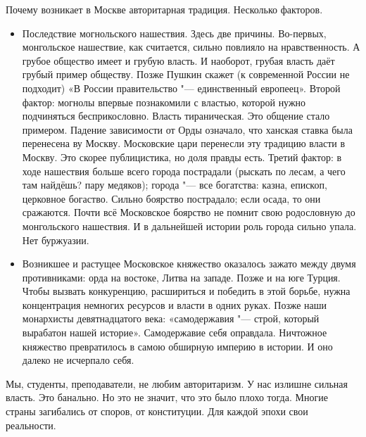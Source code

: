 Почему возникает в Москве авторитарная традиция. Несколько факторов.
\begin{itemize}
\item Последствие могнольского нашествия. Здесь две причины. Во-первых, монгольское нашествие, как считается, сильно повлияло на нравственность. А грубое общество имеет и грубую власть. И наоборот, грубая власть даёт грубый пример обществу. Позже Пушкин скажет (к современной России не подходит) «В России правительство "--- единственный европеец». Второй фактор: могнолы впервые познакомили с властью, которой нужно подчиняться бесприкословно. Власть тираническая. Это общение стало примером. Падение зависимости от Орды означало, что ханская ставка была перенесена ву Москву. Московские цари перенесли эту традицию власти  в Москву. Это скорее публицистика, но доля правды есть. Третий фактор: в ходе нашествия больше всего города пострадали (рыскать по лесам, а чего там найдёшь? пару медяков); города "--- все богатства: казна, епископ, церковное богаство. Сильно боярство пострадало; если осада, то они сражаются. Почти всё Московское боярство не помнит свою родословную до монгольского нашествия. И в дальнейшей истории роль города сильно упала. Нет буржуазии.
\item Возникшее и растущее Московское княжество оказалось зажато между двумя противниками: орда на востоке, Литва на западе. Позже и на юге Турция. Чтобы вызвать конкуренцию, расшириться и победить в этой борьбе, нужна концентрация немногих ресурсов и власти в одних руках. Позже наши монархисты девятнадцатого века: «самодержавия "--- строй, который вырабатон нашей историе». Самодержавие себя оправдала. Ничтожное княжество превратилось в самою обширную империю в истории. И оно далеко не исчерпало себя.
\end{itemize}

Мы, студенты, преподаватели, не любим авторитаризм. У нас излишне сильная власть. Это банально. Но это не значит, что это было плохо тогда. Многие страны загибались от споров, от конституции. Для каждой эпохи свои реальности.

